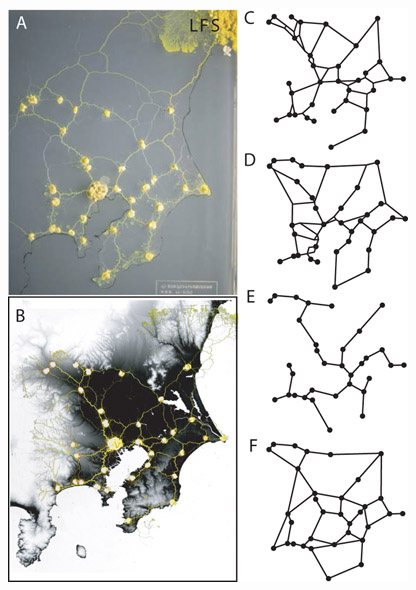 \documentclass[aspectratio=169]{beamer}
\begin{document}
\begin{frame}
\begin{columns}
		\begin{column}{0.4\textwidth}
			\begin{figure}
				\centering
				\includegraphics[width=1\linewidth]{images/slime_mold_2}
				\label{fig:internet}
			\end{figure}
			
		\end{column}
		
	\end{columns}
	
\end{frame}
\end{document}
